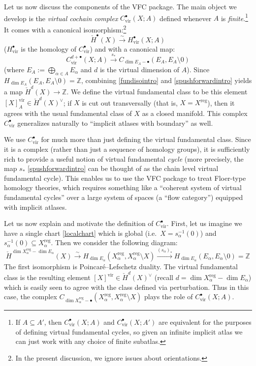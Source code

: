 \documentclass[12pt]{article}
\theoremstyle{definition}
\theoremstyle{remark}
\numberwithin{equation}{subsection}
\newcommand{\ZZ}{\mathbb Z}
\newcommand{\cH}{\check H}
\newcommand{\vir}{\mathrm{vir}}
\newcommand{\reg}{\mathrm{reg}}
\begin{document}
Let us now discuss the components of the VFC package.  The main object we develop is the \emph{virtual cochain complex} $C^\bullet_\vir(X;A)$ defined whenever $A$ is \emph{finite}.\footnote{If $A\subseteq A'$, then $C^\bullet_\vir(X;A)$ and $C^\bullet_\vir(X;A')$ are equivalent for the purposes of defining virtual fundamental cycles, so given an infinite implicit atlas we can just work with any choice of finite subatlas.}  It comes with a canonical isomorphism:\footnote{In the present discussion, we ignore issues about orientations.}
\begin{equation}\label{fundisointro}
\cH^\bullet(X)\xrightarrow\sim H^\bullet_\vir(X;A)
\end{equation}
($H^\bullet_\vir$ is the homology of $C^\bullet_\vir$) and with a canonical map:
\begin{equation}\label{spushforwardintro}
C^{d+\bullet}_\vir(X;A)\xrightarrow{s_\ast}C_{\dim E_A-\bullet}(E_A,E_A\setminus 0)
\end{equation}
(where $E_A:=\bigoplus_{\alpha\in A}E_\alpha$ and $d$ is the virtual dimension of $A$).  Since $H_{\dim E_A}(E_A,E_A\setminus 0)=\ZZ$, combining \eqref{fundisointro} and \eqref{spushforwardintro} yields a map $\cH^d(X)\to\ZZ$.  We define the virtual fundamental class to be this element $[X]^\vir_A\in\cH^d(X)^\vee$; if $X$ is cut out transversally (that is, $X=X^\reg$), then it agrees with the usual fundamental class of $X$ as a closed manifold.  This complex $C_\vir^\bullet$ generalizes naturally to ``implicit atlases with boundary'' as well.

We use $C_\vir^\bullet$ for much more than just defining the virtual fundamental class.  Since it is a complex (rather than just a sequence of homology groups), it is sufficiently rich to provide a useful notion of virtual fundamental \emph{cycle} (more precisely, the map $s_\ast$ \eqref{spushforwardintro} can be thought of as the chain level virtual fundamental cycle).  This enables us to use the VFC package to treat Floer-type homology theories, which requires something like a ``coherent system of virtual fundamental cycles'' over a large system of spaces (a ``flow category'') equipped with implicit atlases.

Let us now explain and motivate the definition of $C^\bullet_\vir$.  First, let us imagine we have a single chart \eqref{localchart} which is global (i.e.\ $X=s_\alpha^{-1}(0)$) and $s_\alpha^{-1}(0)\subseteq X_\alpha^\reg$.  Then we consider the following diagram:
\begin{equation}
\cH^{\dim X_\alpha^\reg-\dim E_\alpha}(X)\xrightarrow\sim H_{\dim E_\alpha}(X_\alpha^\reg,X_\alpha^\reg\setminus X)\xrightarrow{(s_\alpha)_\ast}H_{\dim E_\alpha}(E_\alpha,E_\alpha\setminus 0)=\ZZ
\end{equation}
The first isomorphism is Poincar\'e--Lefschetz duality.  The virtual fundamental class is the resulting element $[X]^\vir\in\cH^d(X)^\vee$ (recall $d=\dim X_\alpha^\reg-\dim E_\alpha$) which is easily seen to agree with the class defined via perturbation.  Thus in this case, the complex $C_{\dim X_\alpha^\reg-\bullet}(X_\alpha^\reg,X_\alpha^\reg\setminus X)$ plays the role of $C^\bullet_\vir(X;A)$.
\end{document}
